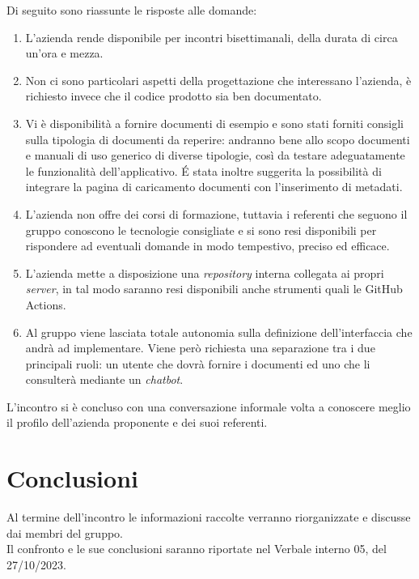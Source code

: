 \noindent
Di seguito sono riassunte le risposte alle domande:
\begin{enumerate}
	\item L'azienda rende disponibile per incontri bisettimanali, della durata di circa un'ora e mezza.
	\item Non ci sono particolari aspetti della progettazione che interessano l'azienda, è richiesto invece che il codice prodotto sia ben documentato.
	\item Vi è disponibilità a fornire documenti di esempio e sono stati forniti consigli sulla tipologia di documenti da reperire: andranno bene allo scopo documenti e manuali di uso generico di diverse tipologie, così da testare adeguatamente le funzionalità dell'applicativo. \'E stata inoltre suggerita la possibilità di integrare la pagina di caricamento documenti con l'inserimento di metadati.
	\item L'azienda non offre dei corsi di formazione, tuttavia i referenti che seguono il gruppo conoscono le tecnologie consigliate e si sono resi disponibili per rispondere ad eventuali domande in modo tempestivo, preciso ed	efficace.
	\item L'azienda mette a disposizione una \textit{repository} interna collegata ai propri \textit{server}, in tal modo saranno resi disponibili anche strumenti quali le GitHub Actions.
	\item Al gruppo viene lasciata totale autonomia sulla definizione dell'interfaccia che andrà ad implementare. Viene però richiesta una separazione tra i due principali ruoli: un utente che dovrà fornire i documenti ed uno che li consulterà mediante un \textit{chatbot}.
\end{enumerate}

\noindent
L'incontro si è concluso con una conversazione informale volta a conoscere meglio il profilo dell'azienda proponente e dei suoi referenti.


\section{Conclusioni}
Al termine dell'incontro le informazioni raccolte verranno riorganizzate e discusse dai membri del gruppo. \\
Il confronto e le sue conclusioni saranno riportate nel Verbale interno 05, del 27/10/2023.

